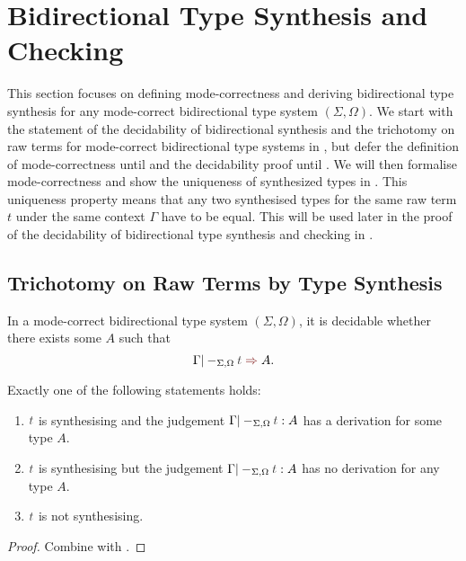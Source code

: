
\section{Bidirectional Type Synthesis and Checking} \label{sec:type-synthesis}
This section focuses on defining mode-correctness and deriving bidirectional type synthesis for any mode-correct bidirectional type system $(\Sigma, \Omega)$.
We start with the statement of the decidability of bidirectional synthesis and the trichotomy on raw terms for mode-correct bidirectional type systems in , but defer the definition of mode-correctness until  and the decidability proof until .
We will then formalise mode-correctness and show the uniqueness of synthesized types in .
This uniqueness property means that any two synthesised types for the same raw term $t$ under the same context $\Gamma$ have to be equal.
This will be used later in the proof of the decidability of bidirectional type synthesis and checking in .

\subsection{Trichotomy on Raw Terms by Type Synthesis} \label{subsec:trichotomy}

\begin{theorem} \label{thm:bidirectional-type-synthesis}
  In a mode-correct bidirectional type system $(\Sigma, \Omega)$,
  it is decidable whether there exists some $A$ such that
  \[
    \Gamma |-_{\Sigma, \Omega} \isTerm{t} \syn A.
  \]
\end{theorem}

\begin{corollary}\label{cor:trichotomy}
  Exactly one of the following statements holds:
  \begin{enumerate}
    \item $\isTerm{t}$ is synthesising and the judgement $\Gamma |-_{\Sigma, \Omega} \isTerm{t} : A$ has a derivation for some type $A$.
    \item $\isTerm{t}$ is synthesising but the judgement $\Gamma |-_{\Sigma, \Omega} \isTerm{t} : A$ has no derivation for any type $A$.
    \item $\isTerm{t}$ is not synthesising.
  \end{enumerate}
\end{corollary}
\begin{proof}
  Combine   with .
  
\end{proof}


